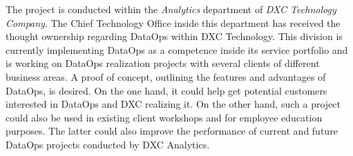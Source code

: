The project is conducted within the \textit{Analytics} department of \textit{DXC Technology Company}. The Chief Technology Office inside this department has received the thought ownership regarding DataOps within DXC Technology. This division is currently implementing DataOps as a competence inside its service portfolio and is working on DataOps realization projects with several clients of different business areas. A proof of concept, outlining the features and advantages of DataOps, is desired. On the one hand, it could help get potential customers interested in DataOps and DXC realizing it. On the other hand, such a project could also be used in existing client workshops and for employee education purposes. The latter could also improve the performance of current and future DataOps projects conducted by DXC Analytics.